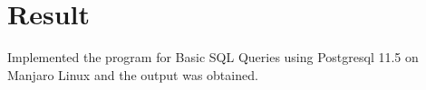 \section{Result}
Implemented the program for Basic SQL Queries using Postgresql 11.5 on Manjaro Linux and the output was obtained.